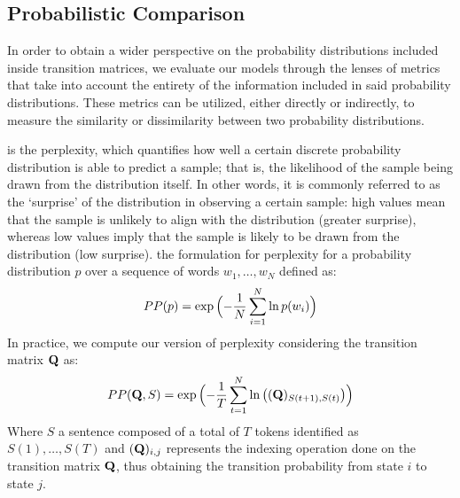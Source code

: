 \subsection{Probabilistic Comparison}\label{ssec:method_fom_prob}

In order to obtain a wider perspective on the probability distributions included inside  transition matrices, we evaluate our models through the lenses of metrics that take into account the entirety of the information included in said probability distributions.
These metrics can be utilized, either directly or indirectly, to measure the similarity or dissimilarity between two probability distributions.

 is the perplexity, which quantifies how well a certain discrete probability distribution is able to predict a sample; that is, the likelihood of the sample being drawn from the distribution itself.
In other words, it is commonly referred to as the `surprise' of the distribution in observing a certain sample: high values mean that the sample is unlikely to align with the distribution (greater surprise), whereas low values imply that the sample is likely to be drawn from the distribution (low surprise).
 the  formulation for perplexity for a probability distribution $p$ over a sequence of words $w_1,\dots,w_N$ defined as:
\begin{equation*}
    PP(p) = \exp{\Bigl(-\frac{1}{N}\sum_{i=1}^{N}{\ln{p(w_i)}}\Bigr)}
\end{equation*}
In practice, we compute our version of perplexity considering the transition matrix $\bm{\mathbf{Q}}$ as:
\begin{equation}
    \label{eq:method_fom_perplexity}
        PP(\bm{\mathbf{Q}}, S) = \exp{\Bigl(-\frac{1}{T}\sum_{t=1}^{N}{\ln{\bigl((\bm{\mathbf{Q}})_{S(t+1),S(t)}\bigr)}}\Bigr)}
\end{equation}
Where $S$  a sentence composed of a total of $T$ tokens identified as $S(1),\dots,S(T)$ and $(\bm{\mathbf{Q}})_{i,j}$ represents the indexing operation done on the transition matrix $\bm{\mathbf{Q}}$, thus obtaining the transition probability from state $i$ to state $j$.

